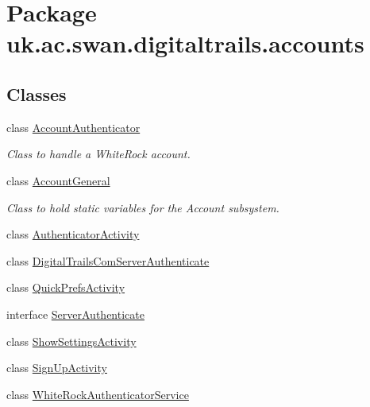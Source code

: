 \hypertarget{namespaceuk_1_1ac_1_1swan_1_1digitaltrails_1_1accounts}{\section{Package uk.\+ac.\+swan.\+digitaltrails.\+accounts}
\label{namespaceuk_1_1ac_1_1swan_1_1digitaltrails_1_1accounts}
}
\subsection*{Classes}
\begin{DoxyCompactItemize}
\item 
class \hyperlink{classuk_1_1ac_1_1swan_1_1digitaltrails_1_1accounts_1_1_account_authenticator}{Account\+Authenticator}
\begin{DoxyCompactList}\small\item\em Class to handle a White\+Rock account. \end{DoxyCompactList}\item 
class \hyperlink{classuk_1_1ac_1_1swan_1_1digitaltrails_1_1accounts_1_1_account_general}{Account\+General}
\begin{DoxyCompactList}\small\item\em Class to hold static variables for the Account subsystem. \end{DoxyCompactList}\item 
class \hyperlink{classuk_1_1ac_1_1swan_1_1digitaltrails_1_1accounts_1_1_authenticator_activity}{Authenticator\+Activity}
\item 
class \hyperlink{classuk_1_1ac_1_1swan_1_1digitaltrails_1_1accounts_1_1_digital_trails_com_server_authenticate}{Digital\+Trails\+Com\+Server\+Authenticate}
\item 
class \hyperlink{classuk_1_1ac_1_1swan_1_1digitaltrails_1_1accounts_1_1_quick_prefs_activity}{Quick\+Prefs\+Activity}
\item 
interface \hyperlink{interfaceuk_1_1ac_1_1swan_1_1digitaltrails_1_1accounts_1_1_server_authenticate}{Server\+Authenticate}
\item 
class \hyperlink{classuk_1_1ac_1_1swan_1_1digitaltrails_1_1accounts_1_1_show_settings_activity}{Show\+Settings\+Activity}
\item 
class \hyperlink{classuk_1_1ac_1_1swan_1_1digitaltrails_1_1accounts_1_1_sign_up_activity}{Sign\+Up\+Activity}
\item 
class \hyperlink{classuk_1_1ac_1_1swan_1_1digitaltrails_1_1accounts_1_1_white_rock_authenticator_service}{White\+Rock\+Authenticator\+Service}
\end{DoxyCompactItemize}
